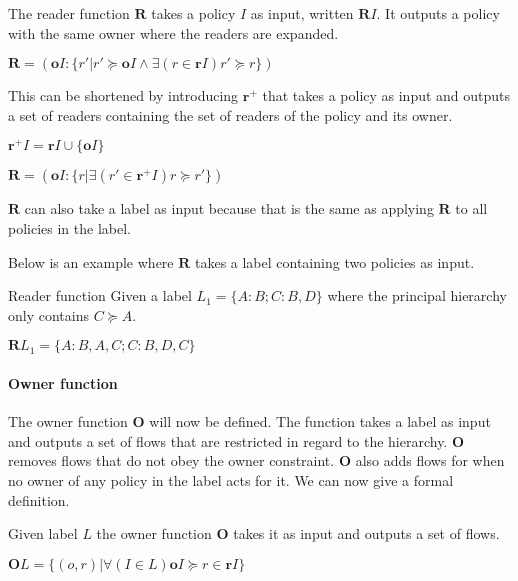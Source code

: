\begin{definition}
  The reader function $\textbf{R}$ takes a policy $I$ as input, written $\textbf{R}I$.
  It outputs a policy with the same owner where the readers are expanded.
  \begin{center}
    $\textbf{R} = (\textbf{o}I : \{r' | r' \succeq \textbf{o}I \wedge \exists(r \in \textbf{r}I) r' \succeq r \})$
  \end{center}
  This can be shortened by introducing $\textbf{r}^+$ that takes a policy as input and outputs a set of readers containing the set of readers of the policy and its owner.
  \begin{center}
    $\textbf{r}^+I = \textbf{r}I \cup \{\textbf{o}I\}$
  \end{center}
  \begin{center}
    $\textbf{R} = (\textbf{o}I : \{r | \exists(r' \in \textbf{r}^+I) r \succeq r' \})$
  \end{center}
  $\textbf{R}$ can also take a label as input because that is the same as applying $\textbf{R}$ to all policies in the label.
\end{definition}

Below is an example where $\textbf{R}$ takes a label containing two policies as input.
\begin{example}{Reader function}\label{example_reader_function}
  Given a label $L_1 = \{A:B; C:B,D\}$ where the principal hierarchy only contains $C \succeq A$.
  \begin{center}
    $\textbf{R}L_1 = \{A:B,A,C; C:B,D,C\}$
  \end{center}
\end{example}

\paragraph{Owner function}
The owner function $\textbf{O}$ will now be defined.
The function takes a label as input and outputs a set of flows that are restricted in regard to the \principal{} hierarchy.
$\textbf{O}$ removes flows that do not obey the owner constraint.
$\textbf{O}$ also adds flows for \principals{} when no owner of any policy in the label acts for it.
We can now give a formal definition.
\begin{definition}
  Given label $L$ the owner function $\textbf{O}$ takes it as input and outputs a set of flows.
  \begin{center}
    $\textbf{O}L = \{(o,r) | \forall (I \in L) \textbf{o}I \succeq r \in \textbf{r}I\}$
  \end{center}
\end{definition}


